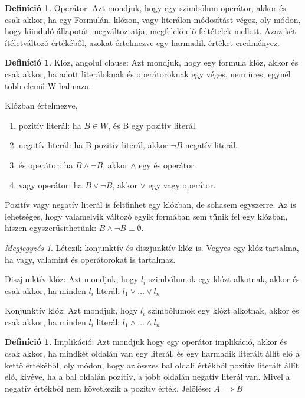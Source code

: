 \documentclass[
]{thesis-ekf}
\theoremstyle{definition}
\newtheorem{definicio}[tetel]{Definíció}
\theoremstyle{remark}
\newtheorem{megjegyzes}[tetel]{Megjegyzés}
\begin{document}
	\begin{definicio}
		Operátor: Azt mondjuk, hogy egy szimbólum operátor, akkor és csak akkor, ha egy Formulán, klózon, vagy literálon módosítást végez, oly módon, hogy kiinduló állapotát megváltoztatja, megfelelő elő feltételek mellett. Azaz két ítéletváltozó értékéből, azokat értelmezve egy harmadik értéket eredményez.
	\end{definicio}
	
	\begin{definicio}
		Klóz, angolul clause: Azt mondjuk, hogy egy formula klóz, akkor és csak akkor, ha adott literáloknak és operátoroknak egy véges, nem üres, egynél több elemű W halmaza.

		Klózban értelmezve,
		\begin{enumerate}
			\item pozitív literál: ha $ B\in W $, és B egy pozitív literál.
			\item negatív literál: ha B pozitív literál, akkor $\neg B $ negatív literál.
			\item és operátor: ha $ B \wedge \neg B $, akkor $\wedge$ egy és operátor.
			\item vagy operátor: ha $ B \vee \neg B $, akkor $\vee$ egy vagy operátor.
		\end{enumerate}
		Pozitív vagy negatív literál is feltűnhet egy klózban, de sohasem egyszerre. Az is lehetséges, hogy valamelyik változó egyik formában sem tűnik fel egy klózban, hiszen egyszerűsíthetünk: $ B \wedge\neg B \equiv\emptyset $.
	\end{definicio}
	
	\begin{megjegyzes}
		Létezik konjunktív és diszjunktív klóz is. Vegyes egy klóz tartalma, ha vagy, valamint és operátorokat is tartalmaz.
	
		Diszjunktív klóz: Azt mondjuk, hogy $ l_{i} $ szimbólumok egy klózt alkotnak, akkor és csak akkor, ha minden $ l_{i} $ literál: $ l_{1}\vee\dots\vee l_{n} $
		
		Konjunktív klóz: Azt mondjuk, hogy $ l_{i} $ szimbólumok egy klózt alkotnak, akkor és csak akkor, ha minden $ l_{i} $ literál: $ l_{1}\wedge\dots\wedge l_{n} $
	\end{megjegyzes}

	\begin{definicio}
		Implikáció: Azt mondjuk hogy egy operátor implikáció, akkor és csak akkor, ha mindkét oldalán van egy literál, és egy harmadik literált állít elő a kettő értékéből, oly módon, hogy az összes bal oldali értékből pozitív literált állít elő, kivéve, ha a bal oldalán pozitív, a jobb oldalán negatív literál van.
		Mivel a negatív értékből nem következik a pozitív érték. Jelölése: $ A \implies B $
	\end{definicio}
\end{document}

